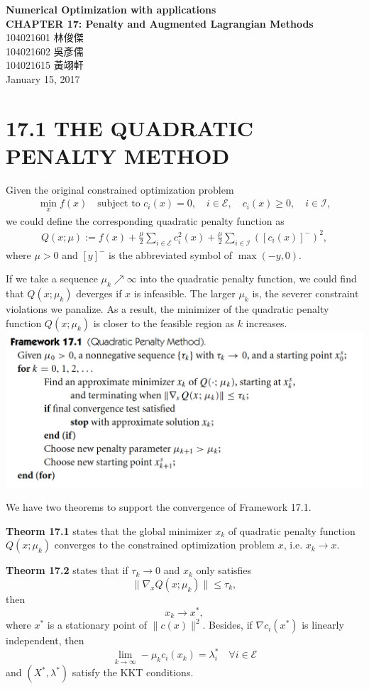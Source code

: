 \documentclass[11pt,a4paper]{article}
\renewcommand{\(}{\left(}
\renewcommand{\)}{\right)}
\renewcommand{\title}{Numerical Optimization with applications\\
	CHAPTER 17: Penalty and Augmented Lagrangian Methods}
\renewcommand{\author}{104021601 林俊傑\\104021602 吳彥儒\\104021615 黃翊軒}
\renewcommand{\maketitle}{\begin{center}\textbf{\Large\title}\\[6pt] {\author}\\[6pt] {\color{Gray}\footnotesize January 15, 2017}\end{center}}
\begin{document}
  \maketitle

\section*{17.1 THE QUADRATIC PENALTY METHOD}
Given the original constrained optimization problem
\begin{align}
\min_xf(x) \quad \text{subject to } c_i(x) = 0 ,\quad i \in \mathcal{E}, \quad c_i(x)\ge 0, \quad i \in \mathcal{I},
\end{align}
we could define the corresponding quadratic penalty function as
\begin{align}
	Q(x;\mu) := f(x)+\frac{\mu}{2}\sum_{i \in \mathcal{E}}c^2_i(x)+\frac{\mu}{2}\sum_{i\in \mathcal{I}}\left( \left[c_i(x) \right]^- \right)^2, 
\end{align}
where $\mu>0$ and $[y]^-$ is the abbreviated symbol of $\max(-y,0)$.

If we take a sequence $\mu_k \nearrow \infty$ into the quadratic penalty function, we could find that $Q(x;\mu_k)$ deverges if $x$ is infeasible. The larger $\mu_k$ is, the severer constraint violations we panalize. As a result, the minimizer of the quadratic penalty function $Q(x;\mu_k)$ is closer to the feasible region as $k$ increases.
\includegraphics[scale=0.6]{fram17_1}

We have two theorems to support the convergence of Framework 17.1.

\textbf{Theorm 17.1} states that the global minimizer $x_k$ of quadratic penalty function $Q(x;\mu_k)$ converges to the constrained optimization problem $x$, i.e. $x_k\rightarrow x$.

\textbf{Theorm 17.2} states that if $\tau_k \rightarrow 0$ and $x_k$ only satisfies $$\|\nabla_xQ(x;\mu_k)\|\le \tau_k,$$ then $$x_k\rightarrow x^*,$$ where $x^*$ is a stationary point of $\|c(x)\|^2$. Besides, if $\nabla c_i(x^*)$ is linearly independent, then $$\lim_{k\rightarrow \infty}-\mu_kc_i(x_k) = \lambda^*_i \quad \forall i \in \mathcal{E}$$ and $(X^*,\lambda^*)$ satisfy the KKT conditions.
\end{document}
